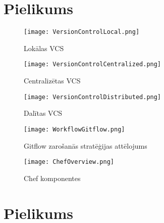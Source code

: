 \begin{appendices}
\chapter{Pielikums}
\label{appx:riceplots}

\begin{figure}[H]%
	\centering
	\captionsetup{justification=centering}
	\texttt{[image: VersionControlLocal.png]}
	\caption{Lokālas VCS}
	\label{appfig:VersionControlLocal}
\end{figure}

\begin{figure}[H]%
	\centering
	\captionsetup{justification=centering}
	\texttt{[image: VersionControlCentralized.png]}
	\caption{Centralizētas VCS}
	\label{appfig:VersionControlCentralized}
\end{figure}

\begin{figure}[H]%
	\centering
	\captionsetup{justification=centering}
	\texttt{[image: VersionControlDistributed.png]}
	\caption{Dalītas VCS}
	\label{appfig:VersionControlDistributed}
\end{figure}

\begin{figure}[H]%
	\centering
	\captionsetup{justification=centering}
	\texttt{[image: WorkflowGitflow.png]}
	\caption{Gitflow zarošanās stratēģijas attēlojums}
	\label{appfig:WorkflowGitflow}
\end{figure}

\begin{figure}[H]%
	\centering
	\captionsetup{justification=centering}
	\texttt{[image: ChefOverview.png]}
	\caption{Chef komponentes}
	\label{appfig:ChefOverview}
\end{figure}

\chapter{Pielikums}



\end{appendices}